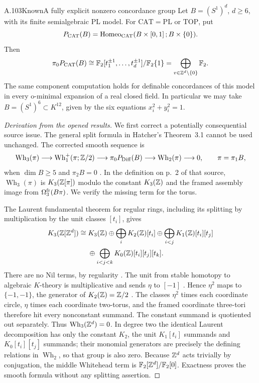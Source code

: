 \begin{saresult}{A.103}{Known}{A fully explicit nonzero concordance group}
Let $B=(S^1)^d$, $d\geq6$, with its finite semialgebraic PL model.
For $\mathrm{CAT}=\mathrm{PL}$ or $\mathrm{TOP}$, put
\[
 P_{\mathrm{CAT}}(B)=
 \operatorname{Homeo}_{\mathrm{CAT}}(B\times[0,1]\,;B\times\{0\}).
\]
Then
\[
 \pi_0P_{\mathrm{CAT}}(B)
 \cong \mathbb F_2[t_1^{\pm1},\ldots,t_d^{\pm1}]/\mathbb F_2\{1\}
 =\bigoplus_{v\in\mathbb Z^d\setminus\{0\}}\mathbb F_2.
\]
The same component computation holds for definable concordances of this
model in every o-minimal expansion of a real closed field. In particular
we may take $B=(S^1)^6\subset K^{12}$, given by the six equations
$x_i^2+y_i^2=1$.
\end{saresult}
\begin{proof}[Derivation from the opened results]
We first correct a potentially consequential source issue. The
general split formula in Hatcher's Theorem~3.1 cannot be used
unchanged. The corrected smooth sequence is
\[
 \operatorname{Wh}_3(\pi)\longrightarrow
 \operatorname{Wh}_1^+(\pi;\mathbb Z/2)\longrightarrow
 \pi_0P_{\rm Diff}(B)\longrightarrow
 \operatorname{Wh}_2(\pi)\longrightarrow0,
 \qquad \pi=\pi_1B,
\]
when $\dim B\geq5$ and $\pi_2B=0$
\cite[Theorem~7.1, p.~23; Remark~7.3, p.~26]{Igusa2025}.
In the definition on p.~2 of that source,
$\operatorname{Wh}_3(\pi)$ is $K_3(\mathbb Z[\pi])$ modulo the constant
$K_3(\mathbb Z)$ and the framed assembly image from
$\Omega^{\rm fr}_3(B\pi)$. We verify the missing term for the torus.

The Laurent fundamental theorem for regular rings, including its
splitting by multiplication by the unit classes $[t_i]$, gives
\[
\begin{split}
K_3(\mathbb Z[\mathbb Z^d])\cong{}&K_3(\mathbb Z)
 \oplus\bigoplus_iK_2(\mathbb Z)[t_i]
 \oplus\bigoplus_{i<j}K_1(\mathbb Z)[t_i][t_j]\\
 &\oplus\bigoplus_{i<j<k}K_0(\mathbb Z)[t_i][t_j][t_k].
\end{split}
\]
There are no Nil terms, by regularity
\cite[Theorem~6.3, Corollary~6.3.1, p.~40; Theorem~8.2, p.~61]{WeibelV}.
The unit from stable homotopy to algebraic $K$-theory is
multiplicative and sends $\eta$ to $[-1]$
\cite[Exercise~1.12, pp.~15--16; Corollary~1.20, p.~13]{WeibelIV}.
Hence $\eta^2$ maps to $\{-1,-1\}$, the generator of
$K_2(\mathbb Z)=\mathbb Z/2$ \cite[Example~5.2.2, p.~36]{WeibelIII}.
The classes $\eta^2$ times each coordinate circle, $\eta$ times
each coordinate two-torus, and the framed coordinate three-tori
therefore hit every nonconstant summand. The constant summand
is quotiented out separately. Thus
$\operatorname{Wh}_3(\mathbb Z^d)=0$. In degree two the identical
Laurent decomposition has only the constant $K_2$, the unit
$K_1[t_i]$ summands and $K_0[t_i][t_j]$ summands; their
monomial generators are precisely the defining relations in
$\operatorname{Wh}_2$, so that group is also zero.
Because $\mathbb Z^d$ acts trivially by conjugation, the middle
Whitehead term is $\mathbb F_2[\mathbb Z^d]/\mathbb F_2[0]$. Exactness proves the
smooth formula without any splitting assertion.


\end{proof}
